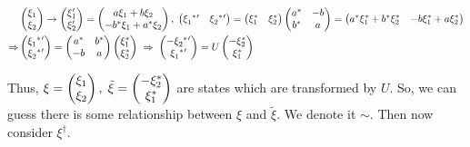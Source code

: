 \documentclass[11pt,letterpaper]{article}
\begin{document}
\begin{align}
\nonumber
&\begin{pmatrix}
  \xi_1 \\
  \xi_2
 \end{pmatrix}
 \rightarrow
 \begin{pmatrix}
  \xi_1' \\
  \xi_2'
 \end{pmatrix}
 =
 \begin{pmatrix}
  a\xi_1 + b\xi_2 \\
  -b^*\xi_1 + a^*\xi_2
 \end{pmatrix}
 \Com
 \begin{pmatrix}
  \tensor{\xi}{_1 ^*}' & \tensor{\xi}{_2 ^*}' 
 \end{pmatrix}
 =
 \begin{pmatrix}
  \xi_1^* & \xi_2^*
 \end{pmatrix}
 \begin{pmatrix}
  a^* & -b \\
  b^* & a
 \end{pmatrix}
 =
 \begin{pmatrix}
  a^*\xi_1^* + b^*\xi_2^* & -b\xi_1^* + a\xi_2^*
 \end{pmatrix} \\
 \Rightarrow &
 \begin{pmatrix}
  \tensor{\xi}{_1 ^*}' \\
  \tensor{\xi}{_2 ^*}' 
 \end{pmatrix}
 =
 \begin{pmatrix}
  a^* & b^* \\
  -b & a
 \end{pmatrix}
 \begin{pmatrix}
  \xi_1^* \\
  \xi_2^*
 \end{pmatrix}
 \hs \Rightarrow \hs 
 \begin{pmatrix}
  -\tensor{\xi}{_2 ^*}' \\
  \tensor{\xi}{_1 ^*}'
 \end{pmatrix}
 = U
 \begin{pmatrix}
  -\xi_2^* \\
  \xi_1^*
 \end{pmatrix}
\end{align}

Thus, $ \xi = 
\begin{pmatrix}
 \xi_1 \\
 \xi_2
\end{pmatrix}
,\hspace{0.1cm} \tilde{\xi} = 
\begin{pmatrix}
 -\xi_2^* \\
 \xi_1^*
\end{pmatrix}$
are states which are transformed by $U$.\footnotemark[1]
So, we can guess there is some relationship between $\xi$ and $\tilde{\xi}$. We denote it $\sim$. Then now consider $\xi^{\dagger}$.
\end{document}
